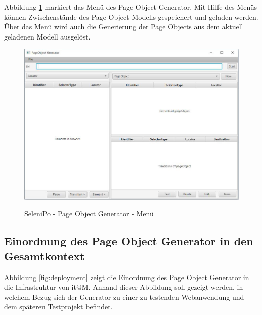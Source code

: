 \newpage

Abbildung \ref{fig:poGeneratorMenu} markiert das Menü des Page Object Generator. Mit Hilfe des Menüs können Zwischenstände des Page Object Modells gespeichert und geladen werden.
Über das Menü wird auch die Generierung der Page Objects aus dem aktuell geladenen Modell ausgelöst.

\begin{figure}[htb]
  \centering  
  \includegraphics[scale=0.5]{img/poGeneratorMenu.JPG}\\
  \caption{SeleniPo - Page Object Generator - Menü}
  \label{fig:poGeneratorMenu}
\end{figure}

\subsection{Einordnung des Page Object Generator in den Gesamtkontext}
\label{sec:deploymentsicht}


Abbildung \ref{fig:deployment} zeigt die Einordnung des Page Object Generator in die Infrastruktur von it@M. Anhand dieser Abbildung soll gezeigt werden, in welchem Bezug sich der Generator zu einer zu testenden Webanwendung und dem späteren Testprojekt befindet.

